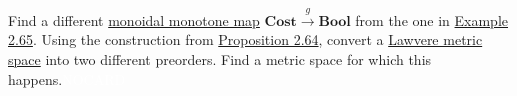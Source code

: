 Find a different \hyperref[D2.41]{monoidal monotone map} $\mathbf{Cost}\xrightarrow{g}\mathbf{Bool}$ from the one in \hyperref[X2.65]{Example 2.65}.  Using the construction from \hyperref[P2.64]{Proposition 2.64}, convert a \hyperref[D2.53]{Lawvere metric space} into two different preorders. Find a metric space for which this happens.\textcolor{white}{NOCARD}